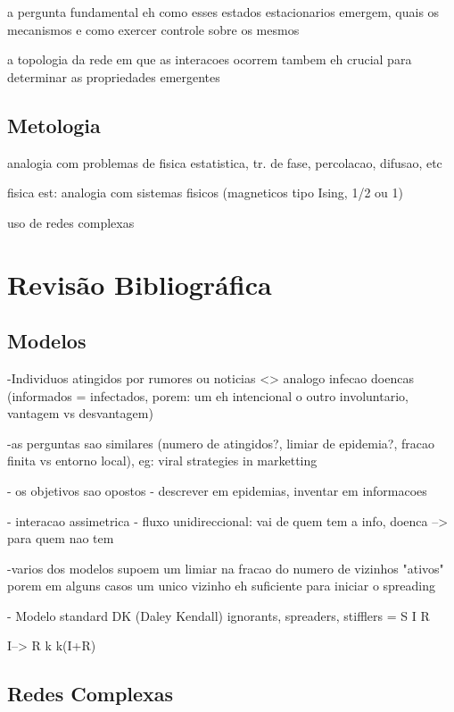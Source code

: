 \documentclass[a4paper,11pt]{report}
\begin{document}
a pergunta fundamental eh como esses estados estacionarios emergem, 
quais os mecanismos e como exercer controle sobre os mesmos


a topologia da rede em que as interacoes ocorrem tambem eh 
crucial para determinar as propriedades emergentes 

\section{Metologia} 

analogia com problemas de fisica estatistica, tr. de fase, percolacao, difusao, etc

fisica est: analogia com sistemas fisicos (magneticos tipo Ising, 1/2 ou 1)

uso de redes complexas

\chapter{Revis\~ao Bibliogr\'afica}
\label{chap:models}

\section{Modelos}
-Individuos atingidos por rumores ou noticias <> analogo infecao doencas
(informados = infectados, porem: um eh intencional o outro involuntario, 
vantagem vs desvantagem) 

-as perguntas sao similares (numero de atingidos?, limiar de epidemia?, 
fracao finita vs entorno local), eg: viral strategies in marketting

- os objetivos sao opostos
- descrever em epidemias, inventar em informacoes

- interacao assimetrica
- fluxo unidireccional: vai de quem tem a info, doenca --> para quem nao tem 

-varios dos modelos supoem um limiar na fracao do numero de vizinhos "ativos"
porem em alguns casos um unico vizinho eh suficiente para iniciar o spreading

- Modelo standard DK (Daley Kendall) 
ignorants, spreaders, stifflers = S I R

I--> R
  k
  k(I+R)
\section{Redes Complexas}
\end{document}
